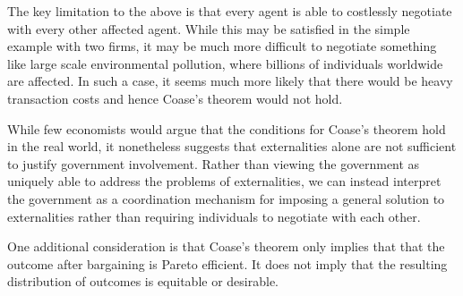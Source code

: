 The key limitation to the above is that every agent is able to costlessly negotiate with every other affected agent. While this may be satisfied in the simple example with two firms, it may be much more difficult to negotiate something like large scale environmental pollution, where billions of individuals worldwide are affected. In such a case, it seems much more likely that there would be heavy transaction costs and hence Coase's theorem would not hold.

While few economists would argue that the conditions for Coase's theorem hold in the real world, it nonetheless suggests that externalities alone are not sufficient to justify government involvement. Rather than viewing the government as uniquely able to address the problems of externalities, we can instead interpret the government as a coordination mechanism for imposing a general solution to externalities rather than requiring individuals to negotiate with each other. 

One additional consideration is that Coase's theorem only implies that that the outcome after bargaining is Pareto efficient. It does not imply that the resulting distribution of outcomes is equitable or desirable.